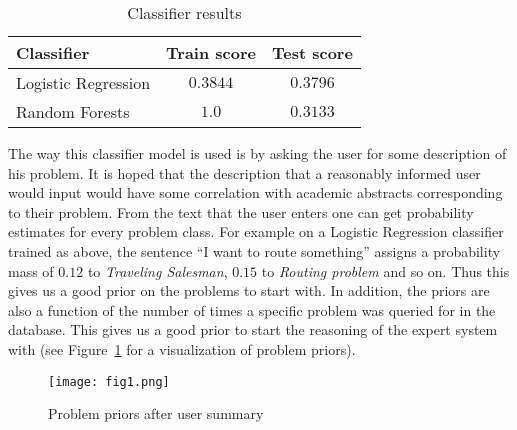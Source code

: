\documentclass[a4paper,10pt]{article}
\begin{document}
\begin{table}[!htb]
  \begin{center}\label{table:exp}
  \def\arraystretch{1.2}
  \begin{tabular}{lcc}
  Classifier &  Train score & Test score \\
  \hline
  Logistic Regression & \(0.3844\) & \(0.3796\)\\
  Random Forests & \(1.0\) & \(0.3133\)\\
 \end{tabular}
\caption{Classifier results}\label{table:score}
\end{center}
\end{table}
  

The way this classifier model is used is by asking the user for some description of his problem. It is hoped
that the description that a reasonably informed user would input would have some correlation
with academic abstracts corresponding to their problem. From the text that the user enters one can get probability
estimates for every problem class. For example on a Logistic Regression classifier trained as above,
the sentence ``I want to route something'' assigns a probability mass of \(0.12\) to \emph{Traveling Salesman},
\(0.15\) to \emph{Routing problem} and so on. Thus this gives us a good prior on the problems to start with. In 
addition, the priors are also a function of the number of times a specific problem was queried for in the
database. This gives us a good prior to start the reasoning of the expert system with (see Figure~\ref{fig:visualization}
for a visualization of problem priors).

\begin{figure}[htb!]
\centering
\texttt{[image: fig1.png]}
\caption{Problem priors after user summary} \label{fig:visualization}
\end{figure}
\end{document}
